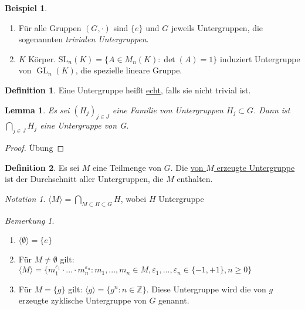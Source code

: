\documentclass[12pt]{scrartcl}%
\newtheorem{lemma}{Lemma}
\theoremstyle{definition}
\newtheorem*{defn}{Definition}
\newtheorem{ex}{Beispiel}
\theoremstyle{remark}
\newtheorem*{notation}{Notation}
\newtheorem*{nb}{Bemerkung}
\DeclareMathOperator{\gl}{GL}
\begin{document}
\begin{ex}
    \begin{enumerate}[label=(\alph*)]
        \item Für alle Gruppen $(G,\cdot)$ sind $\{e\}$ und $G$ jeweils Untergruppen, die sogenannten \emph{trivialen Untergruppen}.
        \item $K$ Körper. $\text{SL}_n(K)=\{A\in M_n(K): \det(A)=1\}$ induziert Untergruppe von $\gl_n(K)$, die spezielle lineare Gruppe.
    \end{enumerate}
\end{ex}

\begin{defn}
    Eine Untergruppe heißt \underline{echt}, falls sie nicht trivial ist.
\end{defn}

\begin{lemma}
	Es sei $(H_{j})_{j \in J}$ eine Familie von Untergruppen $H_{j} \subset G$. Dann ist $\bigcap_{j \in J}H_{j}$ eine Untergruppe von G.
\end{lemma}

\begin{proof}
	Übung
\end{proof}

\begin{defn}
	Es sei $M$ eine Teilmenge von $G$. Die \underline{von $M$ erzeugte Untergruppe} ist der Durchschnitt aller Untergruppen, die $M$ enthalten.
\end{defn}

\begin{notation}
	$\langle M \rangle =\bigcap_{M \subset H \subset G}H$, wobei $H$ Untergruppe
\end{notation}

\begin{nb}
	\begin{enumerate}[label=(\alph*)]
		\item $\langle \emptyset \rangle = \lbrace e \rbrace$
		\item Für $M \neq \emptyset$ gilt: $\langle M \rangle = \lbrace m_{1}^{\varepsilon_{1}} \cdot ... \cdot m_{n}^{\varepsilon_{n}} : m_{1},...,m_{n} \in M, \varepsilon_{1},...,\varepsilon_{n} \in \lbrace -1,+1\rbrace, n \geq 0 \rbrace$
		\item Für $M = \lbrace g \rbrace$ gilt: $\langle g \rangle = \lbrace g^{n} : n \in \mathbb{Z} \rbrace$. Diese Untergruppe wird die von $g$ erzeugte zyklische Untergruppe von $G$ genannt.
	\end{enumerate}
\end{nb}
\end{document}
